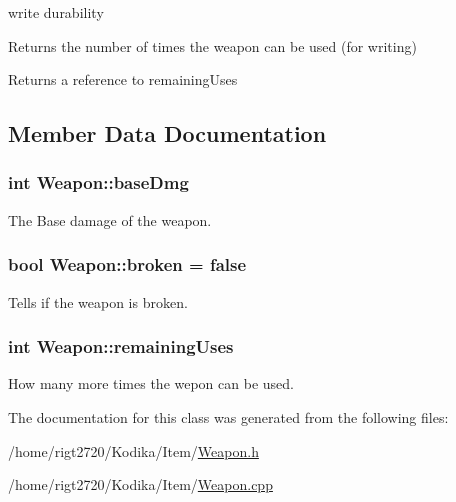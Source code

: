 write durability 

Returns the number of times the weapon can be used (for writing) \begin{DoxyReturn}{Returns}
a reference to remaining\-Uses 
\end{DoxyReturn}


\subsection{Member Data Documentation}
\hypertarget{classWeapon_a81c4f950298060a4b91c4170fc128631}{
\subsubsection[{base\-Dmg}]{\setlength{\rightskip}{0pt plus 5cm}int Weapon\-::base\-Dmg\hspace{0.3cm}{\ttfamily [protected]}}}\label{classWeapon_a81c4f950298060a4b91c4170fc128631}


The Base damage of the weapon. 

\hypertarget{classWeapon_a5191f40be1f7cf9163e042d07f8fcd53}{
\subsubsection[{broken}]{\setlength{\rightskip}{0pt plus 5cm}bool Weapon\-::broken = false\hspace{0.3cm}{\ttfamily [protected]}}}\label{classWeapon_a5191f40be1f7cf9163e042d07f8fcd53}


Tells if the weapon is broken. 

\hypertarget{classWeapon_abbc826be5477aa791910f871d76a1da2}{
\subsubsection[{remaining\-Uses}]{\setlength{\rightskip}{0pt plus 5cm}int Weapon\-::remaining\-Uses\hspace{0.3cm}{\ttfamily [protected]}}}\label{classWeapon_abbc826be5477aa791910f871d76a1da2}


How many more times the wepon can be used. 



The documentation for this class was generated from the following files\-:\begin{DoxyCompactItemize}
\item 
/home/rigt2720/\-Kodika/\-Item/\hyperlink{Weapon_8h}{Weapon.\-h}\item 
/home/rigt2720/\-Kodika/\-Item/\hyperlink{Weapon_8cpp}{Weapon.\-cpp}\end{DoxyCompactItemize}
